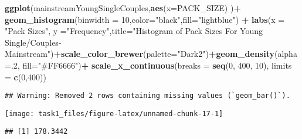 \documentclass[
]{article}
\newenvironment{Shaded}{\begin{snugshade}}{\end{snugshade}}
\newcommand{\AttributeTok}[1]{\textcolor[rgb]{0.13,0.29,0.53}{#1}}
\newcommand{\CommentTok}[1]{\textcolor[rgb]{0.56,0.35,0.01}{\textit{#1}}}
\newcommand{\DecValTok}[1]{\textcolor[rgb]{0.00,0.00,0.81}{#1}}
\newcommand{\FunctionTok}[1]{\textcolor[rgb]{0.13,0.29,0.53}{\textbf{#1}}}
\newcommand{\NormalTok}[1]{#1}
\newcommand{\SpecialCharTok}[1]{\textcolor[rgb]{0.81,0.36,0.00}{\textbf{#1}}}
\newcommand{\StringTok}[1]{\textcolor[rgb]{0.31,0.60,0.02}{#1}}
\begin{document}
\begin{Shaded}
\begin{Highlighting}[]
\FunctionTok{ggplot}\NormalTok{(mainstreamYoungSingleCouples,}\FunctionTok{aes}\NormalTok{(}\AttributeTok{x=}\NormalTok{PACK\_SIZE) )}\SpecialCharTok{+}
  \FunctionTok{geom\_histogram}\NormalTok{(}\AttributeTok{binwidth =} \DecValTok{10}\NormalTok{,}\AttributeTok{color=}\StringTok{"black"}\NormalTok{,}\AttributeTok{fill=}\StringTok{"lightblue"}\NormalTok{) }\SpecialCharTok{+}
  \FunctionTok{labs}\NormalTok{(}\AttributeTok{x =} \StringTok{"Pack Sizes"}\NormalTok{, }\AttributeTok{y =}\StringTok{"Frequency"}\NormalTok{,}\AttributeTok{title=}\StringTok{"Histogram of Pack Sizes For Young Single/Couples{-} Mainstream"}\NormalTok{)}\SpecialCharTok{+}\FunctionTok{scale\_color\_brewer}\NormalTok{(}\AttributeTok{palette=}\StringTok{"Dark2"}\NormalTok{)}\SpecialCharTok{+}\FunctionTok{geom\_density}\NormalTok{(}\AttributeTok{alpha=}\NormalTok{.}\DecValTok{2}\NormalTok{, }\AttributeTok{fill=}\StringTok{"\#FF6666"}\NormalTok{)}\SpecialCharTok{+}
  \FunctionTok{scale\_x\_continuous}\NormalTok{(}\AttributeTok{breaks =} \FunctionTok{seq}\NormalTok{(}\DecValTok{0}\NormalTok{, }\DecValTok{400}\NormalTok{, }\DecValTok{10}\NormalTok{), }\AttributeTok{limits =} \FunctionTok{c}\NormalTok{(}\DecValTok{0}\NormalTok{,}\DecValTok{400}\NormalTok{))}
\end{Highlighting}
\end{Shaded}

\begin{verbatim}
## Warning: Removed 2 rows containing missing values (`geom_bar()`).
\end{verbatim}

\begin{center}\texttt{[image: task1\_files/figure-latex/unnamed-chunk-17-1]} \end{center}

\begin{Shaded}
\end{Shaded}

\begin{verbatim}
## [1] 178.3442
\end{verbatim}

\begin{Shaded}
\end{Shaded}
\end{document}
